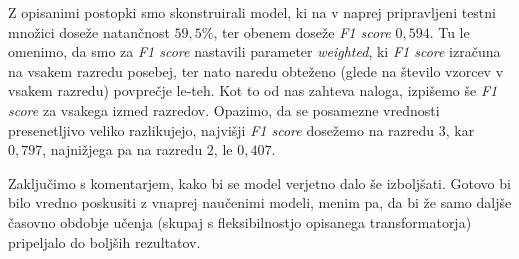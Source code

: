 \documentclass{article}
\begin{document}
Z opisanimi postopki smo skonstruirali model, ki na v naprej pripravljeni testni množici doseže natančnost $59,5\%$, ter obenem doseže \textit{F1 score} $0,594$.
Tu le omenimo, da smo za \textit{F1 score} nastavili parameter \textit{weighted}, ki \textit{F1 score} izračuna na vsakem razredu posebej, ter nato naredu obteženo (glede na število vzorcev v vsakem razredu) povprečje le-teh. 
Kot to od nas zahteva naloga, izpišemo še \textit{F1 score} za vsakega izmed razredov. Opazimo, da se posamezne vrednosti presenetljivo veliko razlikujejo, najvišji \textit{F1 score} dosežemo na razredu $3$, kar $0,797$, najnižjega pa na razredu $2$, le $0,407$.

Zaključimo s komentarjem, kako bi se model verjetno dalo še izboljšati. Gotovo bi bilo vredno poskusiti z vnaprej naučenimi modeli, menim pa, da bi že samo daljše časovno obdobje učenja (skupaj s fleksibilnostjo opisanega transformatorja) pripeljalo do boljših rezultatov.
\end{document}
